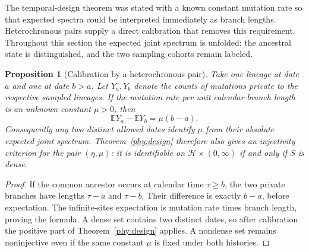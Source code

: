 \documentclass[11pt]{article}
\newtheorem{proposition}[theorem]{Proposition}
\theoremstyle{definition}
\theoremstyle{remark}
\newcommand{\E}{\mathbb E}
\numberwithin{equation}{section}
\begin{document}
The temporal-design theorem was stated with a known constant mutation
rate so that expected spectra could be interpreted immediately as
branch lengths. Heterochronous pairs supply a direct calibration that
removes this requirement. Throughout this section the expected joint
spectrum is unfolded: the ancestral state is distinguished, and the
two sampling cohorts remain labeled.

\begin{proposition}[Calibration by a heterochronous pair]
\label{prop:mutationconstant}
Take one lineage at date $a$ and one at date $b>a$. Let $Y_a,Y_b$
denote the counts of mutations private to the respective sampled
lineages. If the mutation rate per unit calendar branch length is
an unknown constant $\mu>0$, then
\[
 \E Y_a-\E Y_b=\mu(b-a).
\]
Consequently any two distinct allowed dates identify $\mu$ from
their absolute expected joint spectrum. Theorem~\ref{phy:design}
therefore also gives an injectivity criterion for the pair
$(\eta,\mu)$: it is identifiable on
$\mathcal H\times(0,\infty)$ if and only if $S$ is dense.
\end{proposition}
\begin{proof}
If the common ancestor occurs at calendar time $\tau\ge b$, the two
private branches have lengths $\tau-a$ and $\tau-b$. Their difference
is exactly $b-a$, before expectation. The infinite-sites expectation
is mutation rate times branch length, proving the formula. A dense
set contains two distinct dates, so after calibration the positive
part of Theorem~\ref{phy:design} applies. A nondense set remains
noninjective even if the same constant $\mu$ is fixed under both
histories.
\end{proof}
\end{document}
